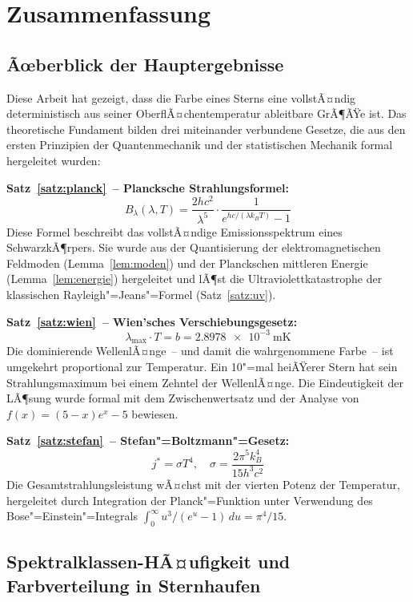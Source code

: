﻿\documentclass[a4paper,12pt]{article}
\theoremstyle{definition}
\begin{document}
\section{Zusammenfassung}

\subsection{Ãœberblick der Hauptergebnisse}

Diese Arbeit hat gezeigt, dass die Farbe eines Sterns eine vollstÃ¤ndig
deterministisch aus seiner OberflÃ¤chentemperatur ableitbare GrÃ¶ÃŸe ist.
Das theoretische Fundament bilden drei miteinander verbundene Gesetze,
die aus den ersten Prinzipien der Quantenmechanik und der statistischen
Mechanik formal hergeleitet wurden:

\textbf{Satz~\ref{satz:planck}~-- Plancksche Strahlungsformel:}
\[
    B_\lambda(\lambda, T) = \frac{2hc^2}{\lambda^5} \cdot
    \frac{1}{e^{hc/(\lambda k_B T)} - 1}
\]
Diese Formel beschreibt das vollstÃ¤ndige Emissionsspektrum eines SchwarzkÃ¶rpers.
Sie wurde aus der Quantisierung der elektromagnetischen Feldmoden
(Lemma~\ref{lem:moden}) und der Planckschen mittleren Energie
(Lemma~\ref{lem:energie}) hergeleitet und lÃ¶st die Ultraviolettkatastrophe
der klassischen Rayleigh"=Jeans"=Formel (Satz~\ref{satz:uv}).

\textbf{Satz~\ref{satz:wien}~-- Wien'sches Verschiebungsgesetz:}
\[
    \lambda_{\max} \cdot T = b = \SI{2.8978e-3}{\metre\kelvin}
\]
Die dominierende WellenlÃ¤nge~-- und damit die wahrgenommene Farbe~-- ist
umgekehrt proportional zur Temperatur. Ein 10"=mal heiÃŸerer Stern hat sein
Strahlungsmaximum bei einem Zehntel der WellenlÃ¤nge.
Die Eindeutigkeit der LÃ¶sung wurde formal mit dem Zwischenwertsatz und
der Analyse von $f(x) = (5-x)e^x - 5$ bewiesen.

\textbf{Satz~\ref{satz:stefan}~-- Stefan"=Boltzmann"=Gesetz:}
\[
    j^* = \sigma T^4, \quad
    \sigma = \frac{2\pi^5 k_B^4}{15 h^3 c^2}
\]
Die Gesamtstrahlungsleistung wÃ¤chst mit der vierten Potenz der Temperatur,
hergeleitet durch Integration der Planck"=Funktion unter Verwendung
des Bose"=Einstein"=Integrals $\int_0^\infty u^3/(e^u-1)\,du = \pi^4/15$.

\subsection{Spektralklassen-HÃ¤ufigkeit und Farbverteilung in Sternhaufen}
\end{document}

